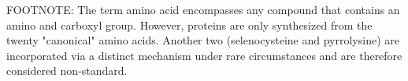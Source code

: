 FOOTNOTE: The term amino acid encompasses any compound that contains an amino and carboxyl group. However, proteins are only synthesized from the twenty "canonical" amino acids. Another two (selenocysteine and pyrrolysine) are incorporated via a distinct mechanism under rare circumstances and are therefore considered non-standard.